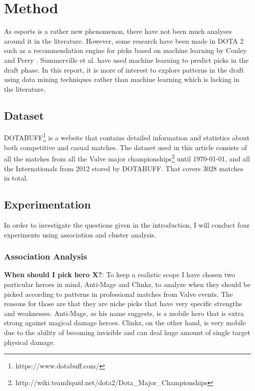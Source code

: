 \documentclass[report.tex]{subfiles}
\begin{document}
\section*{\centering Method}

As esports is a rather new phenomenon, there have not been much analyses around it in the literature. However, some research have been made in DOTA 2 such as a recommendation engine for picks based on machine learning by Conley and Perry \cite{conley2013does}. Summerville et al. \cite{cook2016draft} have used machine learning to predict picks in the draft phase. In this report, it is more of interest to explore patterns in the draft using data mining techniques rather than machine learning which is lacking in the literature.

\subsection*{Dataset}

DOTABUFF\footnote{https://www.dotabuff.com/} is a website that contains detailed information and statistics about both competitive and casual matches. The dataset used in this article consists of all the matches from all the Valve major championships\footnote{http://wiki.teamliquid.net/dota2/Dota\_Major\_Championships} until \today, and all the Internationals from 2012 stored by DOTABUFF. That covers 3028 matches in total.

\subsection*{Experimentation}

In order to investigate the questions given in the introduction, I will conduct four experiments using association and cluster analysis.

\subsubsection*{Association Analysis}

\textbf{When should I pick hero X?}: To keep a realistic scope I have chosen two particular heroes in mind, Anti-Mage and Clinkz, to analyze when they should be picked according to patterns in professional matches from Valve events. The reasons for those are that they are niche picks that have very specific strengths and weaknesses. Anti-Mage, as his name suggests, is a mobile hero that is extra strong against magical damage heroes. Clinkz, on the other hand, is very mobile due to the ability of becoming invisible and can deal huge amount of single target physical damage.
\end{document}
